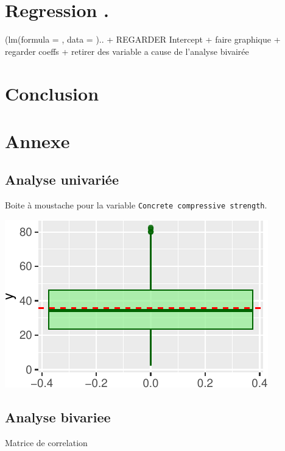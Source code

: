 \documentclass[
  12pt,
]{article}
\begin{document}
\section{Regression .}\label{regression-.}

(lm(formula = , data = ).. + REGARDER Intercept + faire graphique +
regarder coeffs + retirer des variable a cause de l'analyse bivairée

\section{Conclusion}\label{conclusion-1}

\section{Annexe}\label{annexe}

\subsection{Analyse univariée}\label{analyse-univariuxe9e}

Boite à moustache pour la variable
\texttt{Concrete\ compressive\ strength}.

\begin{center}\includegraphics{rmd_final_files/figure-latex/unnamed-chunk-19-1} \end{center}

\subsection{Analyse bivariee}\label{analyse-bivariee}

Matrice de correlation
\end{document}
